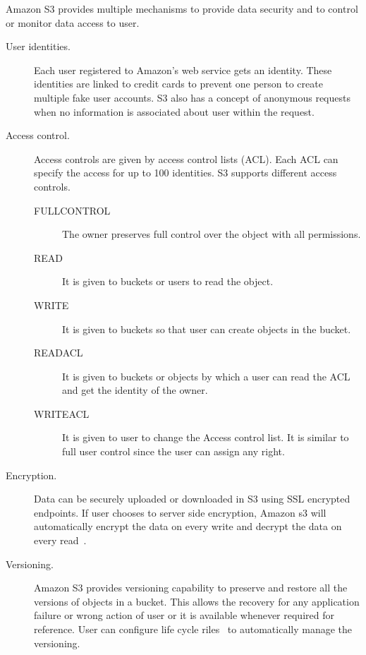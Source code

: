 Amazon S3 provides multiple mechanisms to provide data security and to control
or monitor data access to user.


\begin{description}

\item [User identities.] Each user registered to Amazon’s web service
  gets an identity. These identities are linked to credit cards to
  prevent one person to create multiple fake user accounts. S3 also
  has a concept of anonymous requests when no information is
  associated about user within the request.

\item [Access control.]Access controls are given by access control
  lists (ACL). Each ACL can specify the access for up to 100
  identities. S3 supports different access controls.

\begin{description}
\item [FULLCONTROL] The owner preserves full control over the object
  with all permissions.
\item [READ] It is given to buckets or users to read the object.
\item [WRITE] It is given to buckets so that user can create objects
  in the bucket.
\item [READACL] It is given to buckets or objects by which a user can
  read the ACL and get the identity of the owner.
\item [WRITEACL] It is given to user to change the Access control
  list. It is similar to full user control since the user can assign
  any right.
\end{description}

\item [Encryption.]  Data can be securely uploaded or downloaded in S3
  using SSL encrypted endpoints. If user chooses to server side
  encryption, Amazon s3 will automatically encrypt the data on every
  write and decrypt the data on every
  read~\cite{hid-sp18-420-amazon-S3-data-encryption}.

\item [Versioning.] Amazon S3 provides versioning capability to
  preserve and restore all the versions of objects in a bucket. This
  allows the recovery for any application failure or wrong action of
  user or it is available whenever required for reference. User can
  configure life cycle
  riles~\cite{hid-sp18-420-amazon-S3-lidecycle-rule} to automatically
  manage the versioning.

\end{description}

